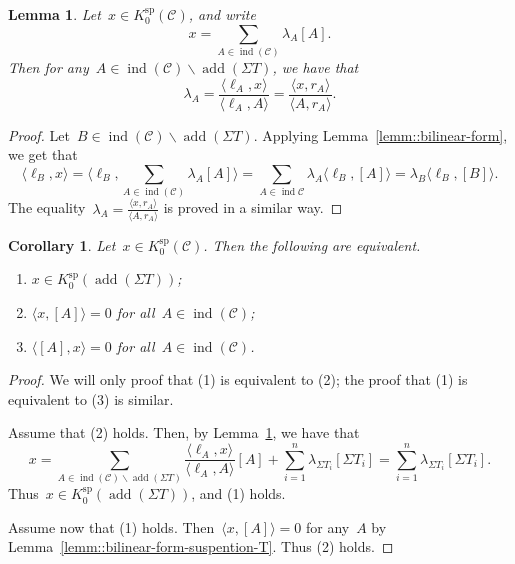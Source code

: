 \documentclass{amsart}
\newtheorem{corollary}[theorem]{Corollary}
\newtheorem{lemma}[theorem]{Lemma}
\theoremstyle{definition}
\newcommand{\ssm}{\smallsetminus} %
\newcommand{\cat}{\mathcal{C}}
\newcommand{\susp}{\Sigma}
\newcommand{\add}{\operatorname{add}}
\newcommand{\spl}{\operatorname{sp}}
\newcommand{\Ksp}{K_0^{\spl}}
\newcommand{\ind}{\operatorname{ind}}
\begin{document}
\begin{lemma}\label{lemm::coefficients}
 Let~$x\in \Ksp(\cat)$, and write~\[x=\sum_{A\in \ind(\cat)} \lambda_A [A].\]  Then for any~$A\in\ind(\cat) \ssm \add(\susp T)$, we have that
 \[
  \lambda_A = \frac{\langle \ell_A, x \rangle}{\langle \ell_A, A \rangle} = \frac{\langle x, r_A \rangle}{\langle A, r_A \rangle}.
 \]
\end{lemma}
\begin{proof}
 Let~$B\in \ind(\cat) \ssm \add(\susp T)$.  Applying Lemma~\ref{lemm::bilinear-form}, we get that
 \[
  \langle \ell_B, x \rangle = \langle \ell_B, \sum_{A\in \ind(\cat)} \lambda_A [A] \rangle = \sum_{A\in \ind{\cat}} \lambda_A \langle \ell_B, [A] \rangle = \lambda_B \langle \ell_B, [B] \rangle.
 \]
 The equality~$\lambda_A = \frac{\langle x, r_A \rangle}{\langle A, r_A \rangle}$ is proved in a similar way.
\end{proof}

\begin{corollary}\label{lemm::test-susp-T}
 Let~$x\in \Ksp(\cat)$.  Then the following are equivalent.
 \begin{enumerate}
  \item $x\in \Ksp(\add(\susp T))$;
  \item $\langle x, [A]\rangle = 0$ for all~$A\in \ind(\cat)$;
  \item $\langle [A], x \rangle = 0$ for all~$A\in \ind(\cat)$.
 \end{enumerate}
\end{corollary}
\begin{proof}
 We will only proof that (1) is equivalent to (2); the proof that (1) is equivalent to (3) is similar.  
 
 Assume that (2) holds.  Then, by Lemma~\ref{lemm::coefficients}, we have that
 \[
  x = \sum_{A\in \ind(\cat) \ssm \add(\susp T)} \frac{\langle \ell_A, x \rangle}{\langle \ell_A, A \rangle}[A] + \sum_{i=1}^n \lambda_{\susp T_i} [\susp T_i] = \sum_{i=1}^n \lambda_{\susp T_i} [\susp T_i].
 \]
 Thus~$x\in \Ksp(\add(\susp T))$, and (1) holds.
 
 Assume now that (1) holds.  Then~$\langle x, [A]\rangle = 0$ for any~$A$ by Lemma~\ref{lemm::bilinear-form-suspention-T}.  Thus (2) holds.
\end{proof}
\end{document}
